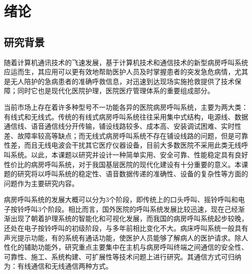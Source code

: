 
\chapter{绪论}
\section{研究背景}
随{\cf}着计{\cf}算机{\cf}通讯{\cf}技术{\cf}的飞速发展，基于计算机技术和通信技术的新型病房呼叫系统应运而生，其应用可以更有效地帮助医护人员及时掌握患者的突发急危病情，尤其是无人陪护的急病患者的准确呼救信息，对迅速到达现场实施抢救提供了技术保障；同时它也是现代化医院护理，医院医疗管理体系的重要组成部分。

当{\cf}前市{\cf}场上{\cf}存在{\cf}着许{\cf}多种{\cf}型号{\cf}不一{\cf}功能{\cf}各异{\cf}的医{\cf}院病{\cf}房呼{\cf}叫系{\cf}统，{\cf}主要{\cf}为两{\cf}大类{\cf}：有{\cf}线式{\cf}和无{\cf}线式{\cf}。传{\cf}统的{\cf}有线{\cf}式病{\cf}房呼{\cf}叫系{\cf}统往{\cf}往采{\cf}用集{\cf}中式{\cf}结构{\cf}，电{\cf}源线{\cf}、数{\cf}据通{\cf}信线{\cf}、语{\cf}音通{\cf}信线{\cf}分开{\cf}传输{\cf}，铺{\cf}设线{\cf}路较{\cf}多、{\cf}成本{\cf}高、{\cf}安装{\cf}调试{\cf}困难{\cf}、实{\cf}时性{\cf}差、{\cf}故障{\cf}率较{\cf}高等{\cf}缺点{\cf}；而{\cf}无线{\cf}式病{\cf}房呼{\cf}叫系{\cf}统不{\cf}存在{\cf}铺设{\cf}线路{\cf}的问{\cf}题，{\cf}但是{\cf}可靠{\cf}性差{\cf}，而{\cf}且无{\cf}线电{\cf}波会{\cf}干扰{\cf}其它{\cf}医疗{\cf}仪器{\cf}设备{\cf}，目{\cf}前大{\cf}多数{\cf}医院{\cf}不采{\cf}用此{\cf}类无{\cf}线呼{\cf}叫系{\cf}统。{\cf}以此{\cf}，本{\cf}课题{\cf}以研{\cf}究并{\cf}设计{\cf}一种{\cf}简单{\cf}实用{\cf}、安{\cf}全可{\cf}靠、{\cf}性能{\cf}稳定{\cf}具有{\cf}良好{\cf}性价{\cf}比的{\cf}病房{\cf}呼叫{\cf}系统{\cf}，对{\cf}于我{\cf}国基{\cf}层医{\cf}院的{\cf}现代{\cf}化建{\cf}设有{\cf}十分{\cf}重要{\cf}的意{\cf}义。{\cf}本课{\cf}题的{\cf}研究{\cf}将以{\cf}呼叫{\cf}系统{\cf}的稳{\cf}定性{\cf}、语{\cf}音数{\cf}据传{\cf}递的{\cf}准确{\cf}性、{\cf}设备{\cf}的复{\cf}杂性{\cf}等方{\cf}面的{\cf}问题{\cf}作为{\cf}主要{\cf}研究{\cf}内容。

病房呼叫系统的发展大概可以分为3个阶段，即传统上的口头呼叫、摇铃呼叫和电子按铃呼叫3个阶段。相比而言，国外医院的呼叫系统发展比较迅速，现在己经渐渐出现了朝着护理系统的智能化和可视化发展，而我国的病房呼叫系统起步较晚，还处在电子按铃呼叫的初级阶段，与多年前相比变化不大。病{\cf}床呼{\cf}叫系{\cf}统一{\cf}般具{\cf}有声{\cf}光提{\cf}示功{\cf}能，{\cf}有的{\cf}系统{\cf}有通{\cf}话功{\cf}能，{\cf}使医{\cf}护人{\cf}员能{\cf}够了{\cf}解病{\cf}人的{\cf}医护{\cf}请求{\cf}。除{\cf}人性{\cf}化的{\cf}辅助{\cf}功能{\cf}外，{\cf}研究{\cf}重点{\cf}主要{\cf}集中{\cf}在主{\cf}机与{\cf}病房{\cf}呼叫{\cf}终端{\cf}之间{\cf}通信{\cf}的安{\cf}全性{\cf}、可{\cf}靠性{\cf}、施{\cf}工、{\cf}系统{\cf}构建{\cf}、可{\cf}扩展{\cf}性等{\cf}技术{\cf}问题{\cf}上进{\cf}行研{\cf}究。{\cf}其通{\cf}信方{\cf}式可{\cf}归纳{\cf}为：{\cf}有线{\cf}通信{\cf}和无{\cf}线通{\cf}信两{\cf}种方{\cf}式。

